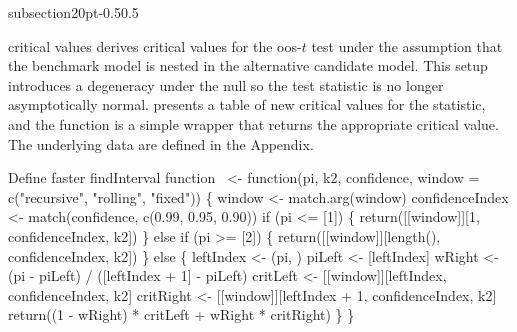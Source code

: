 \documentclass[10pt]{article}%
\makeatletter
\renewcommand\subsection{\@startsection%
{subsection}{2}{0pt}{-0.5\baselineskip}{0.5\baselineskip}%
{\normalfont\normalsize\bfseries\small\raggedright}}
\makeatother
\begin{document}
\subsection{\protect\citet{Mcc:07} critical values}
\citet{Mcc:07} derives critical values for the oos-$t$ test under the
assumption that the benchmark model is nested in the alternative
candidate model.  This setup introduces a degeneracy under the null so
the test statistic is no longer asymptotically normal.  \citet{Mcc:07}
presents a table of new critical values for the statistic, and the
{\Tt{}\nwendquote} function is a simple wrapper that returns
the appropriate critical value.  The underlying data are defined in
the Appendix.

\nwenddocs{}\endmoddef\nwstartdeflinemarkup\nwenddeflinemarkup
\LA{}Define faster \code{}findInterval\edoc{} function~{\nwtagstyle{}}\RA{}
 <- 
  function(pi, k2, confidence, window = c("recursive", "rolling", "fixed")) \{
    window <- match.arg(window)
    confidenceIndex <- match(confidence, c(0.99, 0.95, 0.90))
    if (pi <= [1]) \{
      return([[window]][1, confidenceIndex, k2])
    \} else if (pi >= [2]) \{
      return([[window]][length(), confidenceIndex, k2])
    \} else \{
      leftIndex <- (pi, )
      piLeft <- [leftIndex]
      wRight <- (pi - piLeft) / ([leftIndex + 1] - piLeft)
      critLeft <- [[window]][leftIndex, confidenceIndex, k2]
      critRight <- [[window]][leftIndex + 1, confidenceIndex, k2]
      return((1 - wRight) * critLeft + wRight * critRight)
    \}
  \}
\eatline
{}\nwendcode{}\nwdocspar
\end{document}

